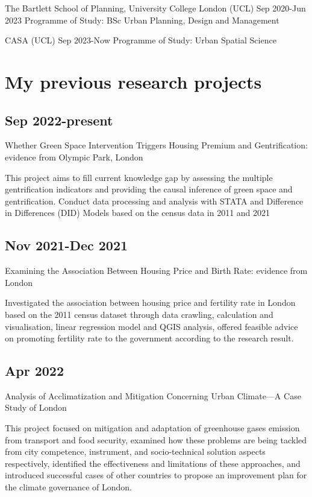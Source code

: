\documentclass[
  letterpaper,
  DIV=11,
  numbers=noendperiod]{scrreprt}
\begin{document}
The Bartlett School of Planning, University College London (UCL) Sep
2020-Jun 2023 Programme of Study: BSc Urban Planning, Design and
Management

CASA (UCL) Sep 2023-Now Programme of Study: Urban Spatial Science

\section{My previous research
projects}\label{my-previous-research-projects}

\subsection{Sep 2022-present}\label{sep-2022-present}

Whether Green Space Intervention Triggers Housing Premium and
Gentrification: evidence from Olympic Park, London

This project aims to fill current knowledge gap by assessing the
multiple gentrification indicators and providing the causal inference of
green space and gentrification. Conduct data processing and analysis
with STATA and Difference in Differences (DID) Models based on the
census data in 2011 and 2021

\subsection{Nov 2021-Dec 2021}\label{nov-2021-dec-2021}

Examining the Association Between Housing Price and Birth Rate: evidence
from London

Investigated the association between housing price and fertility rate in
London based on the 2011 census dataset through data crawling,
calculation and visualisation, linear regression model and QGIS
analysis, offered feasible advice on promoting fertility rate to the
government according to the research result.

\subsection{Apr 2022}\label{apr-2022}

Analysis of Acclimatization and Mitigation Concerning Urban Climate---A
Case Study of London

This project focused on mitigation and adaptation of greenhouse gases
emission from transport and food security, examined how these problems
are being tackled from city competence, instrument, and socio-technical
solution aspects respectively, identified the effectiveness and
limitations of these approaches, and introduced successful cases of
other countries to propose an improvement plan for the climate
governance of London.
\end{document}

